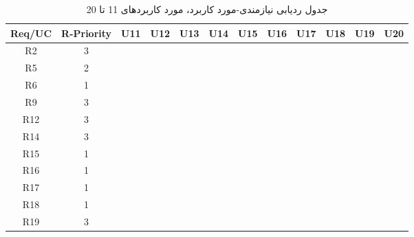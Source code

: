 \documentclass[12pt]{article}
\begin{document}
	\newpage
	\begin{longtable}{|c|c|c|c|c|c|c|c|c|c|c|c|}
		\caption{جدول ردیابی نیازمندی-مورد کاربرد، مورد کاربردهای 11 تا 20}
		\label{tab:req-uc-11-20}
		\endfirsthead
		\endhead
		\hline
		Req/UC      & R-Priority & U11      & U12      & U13      & U14      & U15      & U16      & U17      & U18      & U19      & U20      \\
		\hline
		R2          & 3          &           &           &           &           &           &           &           &           &           &           \\
		\hline
		R5          & 2          &           &           &           &           &           &           &           &           &           &           \\
		\hline
		R6          & 1          &           &           &           &           &           &           &           &           &           &           \\
		\hline
		R9          & 3          &           &           &           &           &           &           &           &           &           &           \\
		\hline
		R12         & 3          &           &           &           &           &           &           &           &           &           &           \\
		\hline
		R14         & 3          &           &           &           &           &           &           &           &           &           &           \\
		\hline
		R15         & 1          &           &           &           &           &           &           &           &           &           &           \\
		\hline
		R16         & 1          &           &           &           &           &           &           &           &           &           &           \\
		\hline
		R17         & 1          &           &           &           &           &           &           &           &           &           &           \\
		\hline
		R18         & 1          &           &           &           &           &           &           &           &           &           &           \\
		\hline
		R19         & 3          &           &           &           &           &           &           &           &           &           &           \\
		\hline

\end{longtable}
\end{document}
